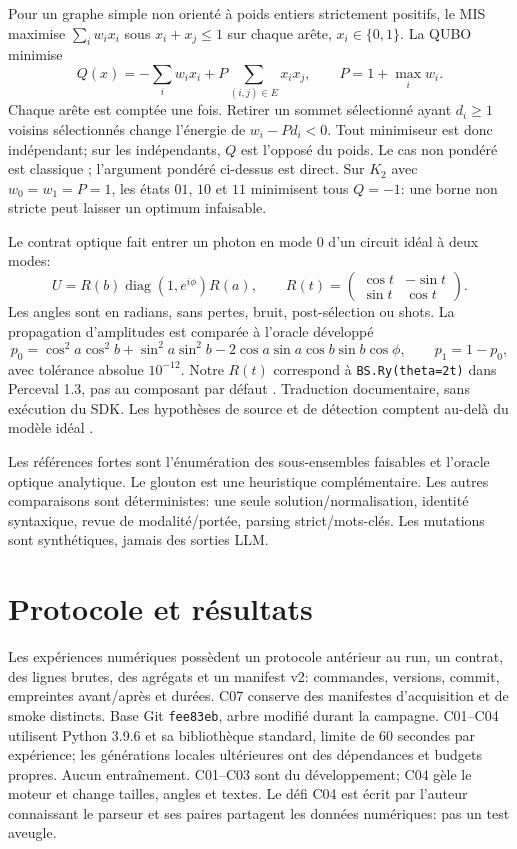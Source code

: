 \documentclass{article}
\begin{document}
Pour un graphe simple non orienté à poids entiers strictement positifs,
le MIS maximise $\sum_i w_i x_i$ sous $x_i+x_j\leq1$ sur chaque arête,
$x_i\in\{0,1\}$. La QUBO minimise
\[
 Q(x)=-\sum_i w_i x_i+P\sum_{(i,j)\in E}x_i x_j,
 \qquad P=1+\max_i w_i .
\]
Chaque arête est comptée une fois. Retirer un sommet sélectionné ayant
$d_i\geq1$ voisins sélectionnés change l'énergie de $w_i-Pd_i<0$.
Tout minimiseur est donc indépendant; sur les indépendants, $Q$ est l'opposé
du poids. Le cas non pondéré est classique \cite{lucas}; l'argument pondéré
ci-dessus est direct.
Sur $K_2$ avec $w_0=w_1=P=1$, les états $01$, $10$ et $11$ minimisent
tous $Q=-1$: une borne non stricte peut laisser un optimum infaisable.

Le contrat optique fait entrer un photon en mode 0 d'un circuit idéal
à deux modes:
\[
 U=R(b)\operatorname{diag}(1,e^{i\phi})R(a),\qquad
 R(t)=\begin{pmatrix}\cos t&-\sin t\\\sin t&\cos t\end{pmatrix}.
\]
Les angles sont en radians, sans pertes, bruit, post-sélection ou shots.
La propagation d'amplitudes est comparée à l'oracle développé
\[
 p_0=\cos^2a\cos^2b+\sin^2a\sin^2b
 -2\cos a\sin a\cos b\sin b\cos\phi,\qquad p_1=1-p_0,
\]
avec tolérance absolue $10^{-12}$.
Notre $R(t)$ correspond à \texttt{BS.Ry(theta=2t)} dans Perceval 1.3,
pas au composant par défaut \cite{components}. Traduction documentaire,
sans exécution du SDK. Les hypothèses de source et de détection comptent
au-delà du modèle idéal \cite{perceval}.

Les références fortes sont l'énumération des sous-ensembles faisables et
l'oracle optique analytique. Le glouton est une heuristique complémentaire.
Les autres comparaisons sont déterministes: une seule solution/normalisation,
identité syntaxique, revue de modalité/portée, parsing strict/mots-clés.
Les mutations sont synthétiques, jamais des sorties LLM.

\section{Protocole et résultats}
Les expériences numériques possèdent un protocole antérieur au run, un contrat, des lignes
brutes, des agrégats et un manifest v2: commandes, versions, commit,
empreintes avant/après et durées. C07 conserve des manifestes d'acquisition et
de smoke distincts. Base Git \texttt{fee83eb}, arbre modifié durant la campagne.
C01--C04 utilisent Python 3.9.6 et sa bibliothèque standard, limite de
60 secondes par expérience; les générations locales ultérieures ont des
dépendances et budgets propres. Aucun entraînement.
C01--C03 sont du développement; C04 gèle le moteur et change tailles, angles
et textes. Le défi C04 est écrit par l'auteur connaissant le parseur et ses
paires partagent les données numériques: pas un test aveugle.
\end{document}
